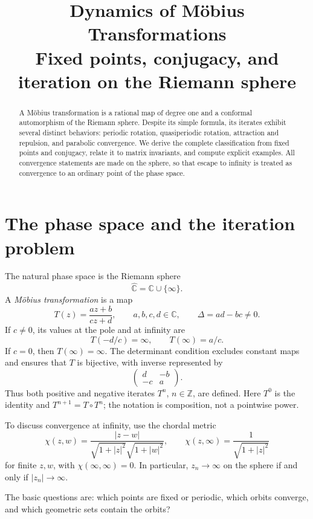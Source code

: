 \documentclass[11pt,a4paper]{article}
\title{Dynamics of M\"obius Transformations\\
  \large Fixed points, conjugacy, and iteration on the Riemann sphere}
\author{}
\date{}
\newcommand{\C}{\mathbb{C}}
\newcommand{\Z}{\mathbb{Z}}
\newcommand{\Chat}{\widehat{\mathbb{C}}}
\newcommand{\abs}[1]{\left|#1\right|}
\newcommand{\chord}{\chi}
\theoremstyle{plain}
\theoremstyle{definition}
\theoremstyle{remark}
\begin{document}
\maketitle

\begin{abstract}
A M\"obius transformation is a rational map of degree one and a conformal
automorphism of the Riemann sphere. Despite its simple formula, its iterates
exhibit several distinct behaviors: periodic rotation, quasiperiodic rotation,
attraction and repulsion, and parabolic convergence. We derive the complete
classification from fixed points and conjugacy, relate it to matrix invariants,
and compute explicit examples. All convergence statements are made on the
sphere, so that escape to infinity is treated as convergence to an ordinary
point of the phase space.
\end{abstract}

\tableofcontents

\section{The phase space and the iteration problem}

The natural phase space is the Riemann sphere
\[
  \Chat=\C\cup\{\infty\}.
\]
A \emph{M\"obius transformation} is a map
\begin{equation}\label{eq:mobius}
  T(z)=\frac{az+b}{cz+d},
  \qquad a,b,c,d\in\C,\qquad \Delta=ad-bc\ne0.
\end{equation}
If $c\ne0$, its values at the pole and at infinity are
\[
  T(-d/c)=\infty,\qquad T(\infty)=a/c.
\]
If $c=0$, then $T(\infty)=\infty$. The determinant condition excludes
constant maps and ensures that $T$ is bijective, with inverse represented by
\[
  \begin{pmatrix}d&-b\\-c&a\end{pmatrix}.
\]
Thus both positive and negative iterates $T^n$, $n\in\Z$, are defined.
Here $T^0$ is the identity and $T^{n+1}=T\circ T^n$; the notation is
composition, not a pointwise power.

To discuss convergence at infinity, use the chordal metric
\[
  \chord(z,w)=\frac{\abs{z-w}}{\sqrt{1+\abs{z}^2}\sqrt{1+\abs{w}^2}},
  \qquad
  \chord(z,\infty)=\frac{1}{\sqrt{1+\abs{z}^2}}
\]
for finite $z,w$, with $\chord(\infty,\infty)=0$. In particular,
$z_n\to\infty$ on the sphere if and only if $\abs{z_n}\to\infty$.

The basic questions are: which points are fixed or periodic, which orbits
converge, and which geometric sets contain the orbits?
\end{document}
